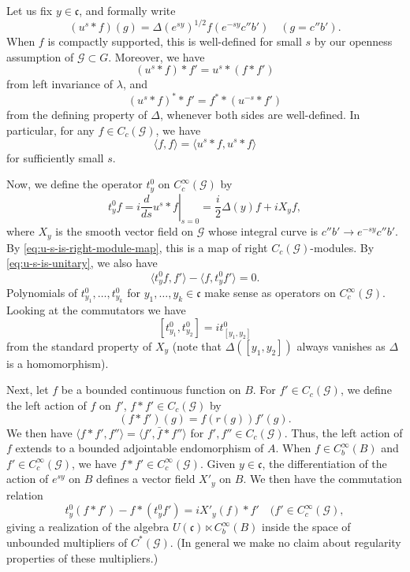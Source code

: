 \documentclass[a4paper,11pt]{amsart}
\newcommand{\s}[1]{\mathcal{#1}}
\newcommand{\fr}[1]{\mathfrak{#1}}
\theoremstyle{definition}
\theoremstyle{remark}
\begin{document}
Let us fix $y \in \fr c$, and formally write
\[
(u^s * f)(g) = \Delta(e^{s y})^{1/2} f(e^{-s y} c'' b') \quad (g = c'' b').
\]
When $f$ is compactly supported, this is well-defined for small $s$ by our openness assumption of $\s G \subset G$.
Moreover, we have
\begin{equation}\label{eq:u-s-is-right-module-map}
(u^s * f) * f' = u^s * (f * f')
\end{equation}
from left invariance of $\lambda$, and
\begin{equation}\label{eq:u-s-is-unitary}
(u^s * f)^* * f' = f^* * (u^{-s} * f')
\end{equation}
from the defining property of $\Delta$, whenever both sides are well-defined.
In particular, for any $f \in C_c(\s G)$, we have
\[
\langle f, f \rangle = \langle u^s * f, u^s * f \rangle
\]
for sufficiently small $s$.

Now, we define the operator $t^0_y$ on $C^\infty_c(\s G)$ by
\[
t^0_y f = i \left.\frac{d}{d s} u^s * f\right|_{s=0} = \frac{i}{2} \Delta(y) f + i X_y f,
\]
where $X_y$ is the smooth vector field on $\s G$ whose integral curve is $c'' b' \to e^{-s y} c'' b'$.
By \eqref{eq:u-s-is-right-module-map}, this is a map of right $C_c(\s G)$-modules.
By \eqref{eq:u-s-is-unitary}, we also have
\[
\langle t^0_y f, f' \rangle - \langle f, t^0_y f' \rangle = 0.
\]
Polynomials of $t^0_{y_1}, \dots, t^0_{y_k}$ for $y_1, \dots, y_k \in \fr c$ make sense as operators on $C^\infty_c(\s G)$.
Looking at the commutators we have
\[
[t^0_{y_1}, t^0_{y_2}] = i t^0_{[y_1, y_2]}
\]
from the standard property of $X_y$ (note that $\Delta([y_1, y_2])$ always vanishes as $\Delta$ is a homomorphism).

Next, let $f$ be a bounded continuous function on $B$.
For $f' \in C_c(\s G)$, we define the left action of $f$ on $f'$, $f * f' \in C_c(\s G)$ by
\[
(f * f')(g) = f(r(g)) f'(g).
\]
We then have $\langle f * f', f'' \rangle = \langle f', \bar f * f'' \rangle$ for $f', f'' \in C_c(\s G)$.
Thus, the left action of $f$ extends to a bounded adjointable endomorphism of $A$.
When $f \in C^\infty_b(B)$ and $f' \in C^\infty_c(\s G)$, we have $f * f' \in C^\infty_c(\s G)$.
Given $y \in \fr c$, the differentiation of the action of $e^{s y}$ on $B$ defines a vector field $X'_y$ on $B$.
We then have the commutation relation
\[
t^0_y (f * f') - f * (t^0_y f') = i X'_y(f) * f' \quad (f' \in C^\infty_c(\s G),
\]
giving a realization of the algebra $U(\fr c) \ltimes C^\infty_b(B)$ inside the space of unbounded multipliers of $C^*(\s G)$.
(In general we make no claim about regularity properties of these multipliers.)
\end{document}
